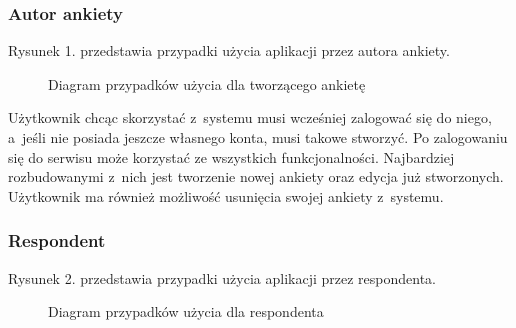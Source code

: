 \documentclass[12pt,a4paper,notitlepage]{article}
\begin{document}
\subsubsection{Autor ankiety}
Rysunek 1. przedstawia przypadki użycia aplikacji przez autora ankiety.
\begin{figure}[H]
\begin{center}
\caption{Diagram przypadków użycia dla tworzącego ankietę}
\end{center}
\end{figure}
Użytkownik chcąc skorzystać z~systemu musi wcześniej zalogować się do niego, a~jeśli nie posiada jeszcze własnego konta, musi takowe stworzyć. Po zalogowaniu się do serwisu może korzystać ze wszystkich funkcjonalności. Najbardziej rozbudowanymi z~nich jest tworzenie nowej ankiety oraz edycja już stworzonych. Użytkownik ma również możliwość usunięcia swojej ankiety z~systemu. 

\subsubsection{Respondent}
Rysunek 2. przedstawia przypadki użycia aplikacji przez respondenta.
\begin{figure}[H]
\begin{center}
\caption{Diagram przypadków użycia dla respondenta}
\end{center}
\end{figure}
\end{document}

